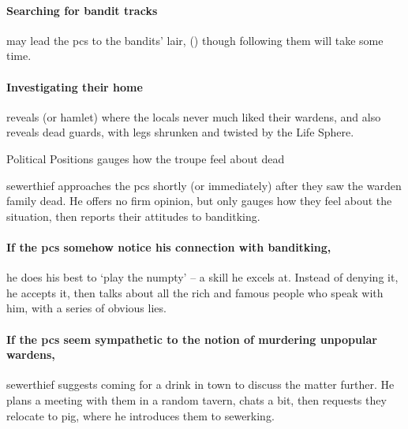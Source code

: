 \paragraph{Searching for bandit tracks}
may lead the \glspl{pc} to the bandits' lair, () though
following them will take some time.%

\paragraph{Investigating their home}
reveals  (or hamlet) where the locals never much liked their \glspl{warden}, and also reveals dead guards, with legs shrunken and twisted by the Life Sphere.

{Political Positions}%
{ gauges how the troupe feel about dead }%
\label{politicalPositions}

\Gls{sewerthief} approaches the \glspl{pc} shortly (or immediately) after they saw the \gls{warden} family dead.
He offers no firm opinion, but only gauges how they feel about the situation, then reports their attitudes to \gls{banditking}.%

\paragraph{If the \glspl{pc} somehow notice his connection with \gls{banditking},}
he does his best to `play the numpty' -- a skill he excels at.
Instead of denying it, he accepts it, then talks about all the rich and famous people who speak with him, with a series of obvious lies.

\paragraph{If the \glspl{pc} seem sympathetic to the notion of murdering unpopular \glspl{warden},}
\gls{sewerthief} suggests coming for a drink in \gls{town} to discuss the matter further.
He plans a meeting with them in a random tavern, chats a bit, then requests they relocate to \gls{pig}, where he introduces them to \gls{sewerking}.

